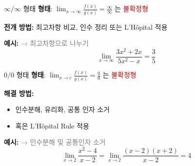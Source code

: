 \documentclass[aspectratio=169]{beamer}
\begin{document}
\begin{frame}{$ \infty / \infty $ 형태}
  \textbf{형태}: \( \lim_{x \to \infty} \frac{f(x)}{g(x)} = \frac{\infty}{\infty} \) 는 \textcolor{red}{불확정형}

  \vspace{0.5em}
  \textbf{전개 방법:} 최고차항 비교, 인수 정리 또는 L'Hôpital 적용

  \vspace{1em}
  \textbf{예시:}
  \textcolor{gray}{→ 최고차항으로 나누기}
  \[
    \lim_{x \to \infty} \frac{3x^2 + 2x}{5x^2 - x} = \frac{3}{5}
  \]

  
\end{frame}



\begin{frame}{$ 0 / 0 $ 형태}
  \textbf{형태}: \( \lim_{x \to c} \frac{f(x)}{g(x)} = \frac{0}{0} \) 는 \textcolor{red}{불확정형}

  \vspace{0.5em}
  \textbf{해결 방법:}
  \begin{itemize}
    \item 인수분해, 유리화, 공통 인자 소거
    \item 혹은 L'Hôpital Rule 적용
  \end{itemize}

  \vspace{1em}
  \textbf{예시:}
  \textcolor{gray}{→ 인수분해 및 공통인자 소거}
  \[
    \lim_{x \to 2} \frac{x^2 - 4}{x - 2} = \lim_{x \to 2} \frac{(x-2)(x+2)}{x-2} = 4
  \]

\end{frame}
\end{document}
